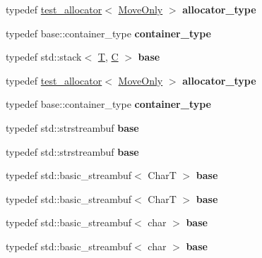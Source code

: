 \begin{DoxyCompactItemize}
typedef \mbox{\hyperlink{classtest__allocator}{test\+\_\+allocator}}$<$ \mbox{\hyperlink{class_move_only}{Move\+Only}} $>$ {\bfseries allocator\+\_\+type}
\item 
\mbox{\label{structtest_a73247bd60092d6e305cfa4fe71ba65a8}} 
typedef base\+::container\+\_\+type {\bfseries container\+\_\+type}
\item 
\mbox{\label{structtest_a9321c07cf59bfdba1c346b59def490bc}} 
typedef std\+::stack$<$ \mbox{\hyperlink{struct_t}{T}}, \mbox{\hyperlink{struct_c}{C}} $>$ {\bfseries base}
\item 
\mbox{\label{structtest_a0daf173ec406459788a2e32d28ea6592}} 
typedef \mbox{\hyperlink{classtest__allocator}{test\+\_\+allocator}}$<$ \mbox{\hyperlink{class_move_only}{Move\+Only}} $>$ {\bfseries allocator\+\_\+type}
\item 
\mbox{\label{structtest_a73247bd60092d6e305cfa4fe71ba65a8}} 
typedef base\+::container\+\_\+type {\bfseries container\+\_\+type}
\item 
\mbox{\label{structtest_a3375ad2fddf0449bad413051c713fe8e}} 
typedef std\+::strstreambuf {\bfseries base}
\item 
\mbox{\label{structtest_a3375ad2fddf0449bad413051c713fe8e}} 
typedef std\+::strstreambuf {\bfseries base}
\item 
\mbox{\label{structtest_a62a689a4683336b8f85ad0cb79e2e5d3}} 
typedef std\+::basic\+\_\+streambuf$<$ CharT $>$ {\bfseries base}
\item 
\mbox{\label{structtest_a62a689a4683336b8f85ad0cb79e2e5d3}} 
typedef std\+::basic\+\_\+streambuf$<$ CharT $>$ {\bfseries base}
\item 
\mbox{\label{structtest_ae7488bd18a7ecb2581088e9de82559ad}} 
typedef std\+::basic\+\_\+streambuf$<$ char $>$ {\bfseries base}
\item 
\mbox{\label{structtest_ae7488bd18a7ecb2581088e9de82559ad}} 
typedef std\+::basic\+\_\+streambuf$<$ char $>$ {\bfseries base}
\item 

\end{DoxyCompactItemize}
